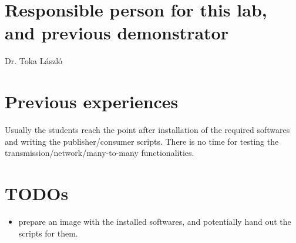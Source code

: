 \documentclass[a4paper]{article}
\begin{document}
\section{Responsible person for this lab, and previous demonstrator}
Dr. Toka László 

\section{Previous experiences}
Usually the students reach the point after installation of the required softwares and writing the publisher/consumer scripts. There is no time for testing the transmission/network/many-to-many functionalities.

\section{TODOs}
\begin{itemize}
\item prepare an image with the installed softwares, and potentially hand out the scripts for them.
\end{itemize}
\end{document}
